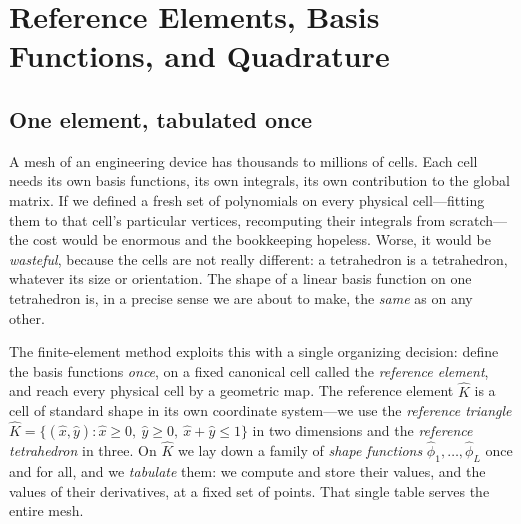 \chapter{Reference Elements, Basis Functions, and Quadrature}
\label{ch:refelement}


\section{One element, tabulated once}

A mesh of an engineering device has thousands to millions of cells. Each cell needs
its own basis functions, its own integrals, its own contribution to the global
matrix. If we defined a fresh set of polynomials on every physical cell---fitting
them to that cell's particular vertices, recomputing their integrals from
scratch---the cost would be enormous and the bookkeeping hopeless. Worse, it would
be \emph{wasteful}, because the cells are not really different: a tetrahedron is a
tetrahedron, whatever its size or orientation. The shape of a linear basis function
on one tetrahedron is, in a precise sense we are about to make, the \emph{same} as on
any other.

The finite-element method exploits this with a single organizing decision: define
the basis functions \emph{once}, on a fixed canonical cell called the
\emph{reference element}, and reach every physical cell by a geometric map. The
reference element $\hat K$ is a cell of standard shape in its own coordinate
system---we use the \emph{reference triangle} $\hat K = \{(\hat x,\hat y): \hat
x\ge 0,\ \hat y\ge 0,\ \hat x+\hat y\le 1\}$ in two dimensions and the
\emph{reference tetrahedron} in three. On $\hat K$ we lay down a family of
\emph{shape functions} $\hat\phi_1,\dots,\hat\phi_L$ once and for all, and we
\emph{tabulate} them: we compute and store their values, and the values of their
derivatives, at a fixed set of points. That single table serves the entire mesh.

